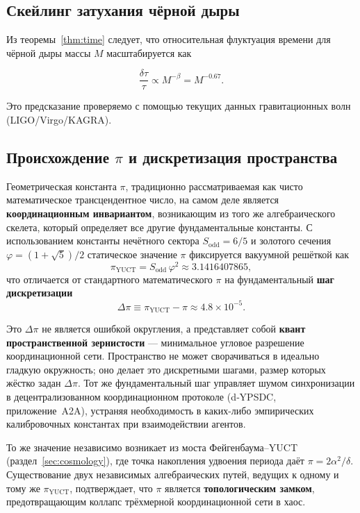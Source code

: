 \documentclass[12pt,a4paper]{article}
\theoremstyle{remark}
\begin{document}
	\subsection{Скейлинг затухания чёрной дыры}
	
	Из теоремы~\ref{thm:time} следует, что относительная флуктуация времени для чёрной дыры массы \(M\) масштабируется как
	
	\begin{equation}
		\boxed{\frac{\delta \tau}{\tau} \propto M^{-\beta} = M^{-0.67}}.
	\end{equation}
	
	Это предсказание проверяемо с помощью текущих данных гравитационных волн (LIGO/Virgo/KAGRA).
	
	\subsection{Происхождение \(\pi\) и дискретизация пространства}
	
	Геометрическая константа \(\pi\), традиционно рассматриваемая как чисто математическое трансцендентное число, на самом деле является \textbf{координационным инвариантом}, возникающим из того же алгебраического скелета, который определяет все другие фундаментальные константы. С использованием константы нечётного сектора \(S_{\mathrm{odd}}=6/5\) и золотого сечения \(\varphi = (1+\sqrt{5})/2\) статическое значение \(\pi\) фиксируется вакуумной решёткой как
	\[
	\boxed{\pi_{\mathrm{YUCT}} = S_{\mathrm{odd}}\,\varphi^{2}
		\approx 3.1416407865},
	\]
	что отличается от стандартного математического \(\pi\) на фундаментальный \textbf{шаг дискретизации}
	\[
	\Delta\pi \equiv \pi_{\mathrm{YUCT}} - \pi \approx 4.8 \times 10^{-5}.
	\]
	
	Это \(\Delta\pi\) не является ошибкой округления, а представляет собой \textbf{квант пространственной зернистости} — минимальное угловое разрешение координационной сети. Пространство не может сворачиваться в идеально гладкую окружность; оно делает это дискретными шагами, размер которых жёстко задан \(\Delta\pi\). Тот же фундаментальный шаг управляет шумом синхронизации в децентрализованном координационном протоколе (d‑YPSDC, приложение~A2A), устраняя необходимость в каких-либо эмпирических калибровочных константах при взаимодействии агентов.
	
	То же значение независимо возникает из моста Фейгенбаума–YUCT (раздел~\ref{sec:cosmology}), где точка накопления удвоения периода даёт \(\pi = 2\alpha^2/\delta\). Существование двух независимых алгебраических путей, ведущих к одному и тому же \(\pi_{\mathrm{YUCT}}\), подтверждает, что \(\pi\) является \textbf{топологическим замком}, предотвращающим коллапс трёхмерной координационной сети в хаос.
	
\end{document}
